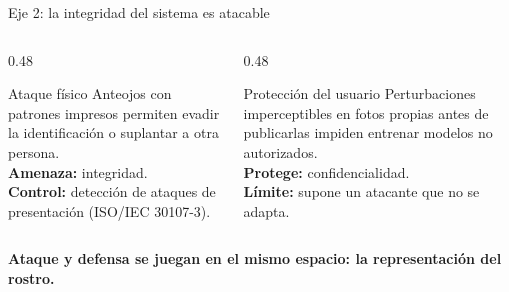 \begin{frame}{Eje 2: la integridad del sistema es atacable}
  \begin{columns}[T]
    \begin{column}{0.48\textwidth}
      \begin{block}{Ataque f\'isico \cite{sharif_accessorize_2016}}
        \scriptsize
        Anteojos con patrones impresos permiten evadir la identificaci\'on o
        suplantar a otra persona.\\[4pt]
        \textbf{Amenaza:} integridad.\\
        \textbf{Control:} detecci\'on de ataques de presentaci\'on
        (ISO/IEC 30107-3).
      \end{block}
    \end{column}
    \begin{column}{0.48\textwidth}
      \begin{block}{Protecci\'on del usuario \cite{shan_fawkes_2020}}
        \scriptsize
        Perturbaciones imperceptibles en fotos propias antes de publicarlas
        impiden entrenar modelos no autorizados.\\[4pt]
        \textbf{Protege:} confidencialidad.\\
        \textbf{L\'imite:} supone un atacante que no se adapta.
      \end{block}
    \end{column}
  \end{columns}

  \vspace{0.2cm}
  \begin{center}
    \scriptsize\color{tecnavy}\textbf{Ataque y defensa se juegan en el mismo
    espacio: la representaci\'on del rostro.}
  \end{center}
\end{frame}

